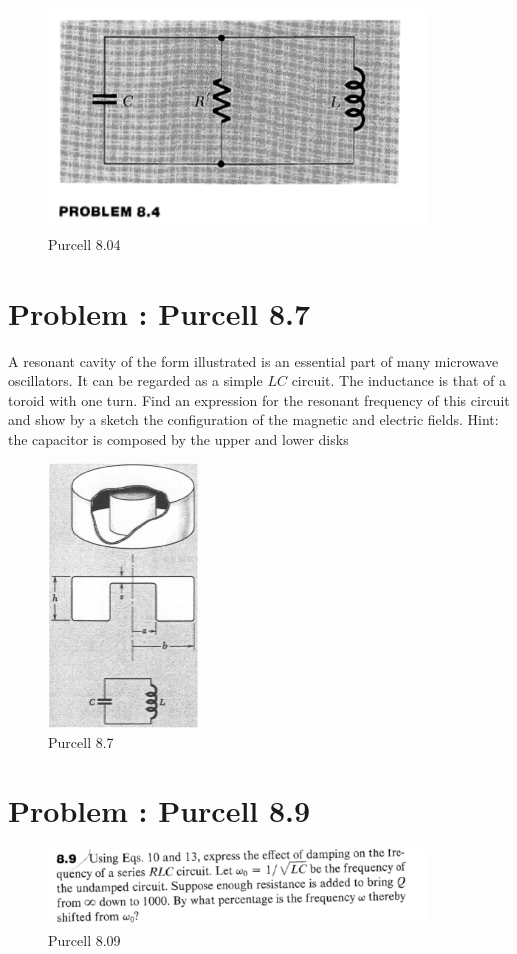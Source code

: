 \documentclass[problems]{esg8022pset}
\begin{document}
  \begin{figure}[H]
    \centering
    \includegraphics[width = 10cm]{figpu804}
    \caption{Purcell 8.04}
  \end{figure}

\section{Problem \thesection: Purcell 8.7}
 A resonant cavity of the form illustrated is an essential part of many microwave oscillators. It can be regarded as a simple $LC$ circuit. The inductance is that of a toroid with one turn. Find an expression for the resonant frequency of this circuit and show by a sketch the configuration of the magnetic and electric fields.
 Hint: the capacitor is composed by the upper and lower disks
 \begin{figure}[H]
    \centering
    \includegraphics[width = 4cm]{pu807}
    \caption{Purcell 8.7}
    \label{fig:cavity2}
  \end{figure}

\section{Problem \thesection: Purcell 8.9}
\begin{figure}[H]
    \centering
    \includegraphics[width = 10cm]{pu809}
    \caption{Purcell 8.09}
  \end{figure}
\end{document}
